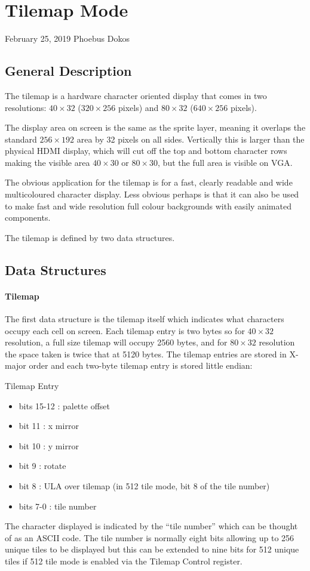 \section{Tilemap Mode}

February 25, 2019  Phoebus Dokos

\subsection{General Description}
The tilemap is a hardware character oriented display that comes in two
resolutions: $40\times32$ ($320\times256$ pixels) and $80\times32$
($640\times256$ pixels).

The display area on screen is the same as the sprite layer, meaning it
overlaps the standard $256\times192$ area by 32 pixels on all
sides. Vertically this is larger than the physical HDMI display, which
will cut off the top and bottom character rows making the visible area
$40\times30$ or $80\times30$, but the full area is visible on VGA.

The obvious application for the tilemap is for a fast, clearly
readable and wide multicoloured character display. Less obvious
perhaps is that it can also be used to make fast and wide resolution
full colour backgrounds with easily animated components.

The tilemap is defined by two data structures.

\subsection{Data Structures}

\paragraph{Tilemap}

The first data structure is the tilemap itself which indicates what
characters occupy each cell on screen. Each tilemap entry is two bytes
so for $40\times32$ resolution, a full size tilemap will occupy 2560
bytes, and for $80\times32$ resolution the space taken is twice that
at 5120 bytes. The tilemap entries are stored in X-major order and
each two-byte tilemap entry is stored little endian:

Tilemap Entry
\begin{itemize}
\item[] bits 15-12 : palette offset
\item[] bit 11 : x mirror
\item[] bit 10 : y mirror
\item[] bit 9 : rotate
\item[] bit 8 : ULA over tilemap (in 512 tile mode, bit 8 of the tile number)
\item[] bits 7-0 : tile number
\end{itemize}
The character displayed is indicated by the “tile number” which can be
thought of as an ASCII code. The tile number is normally eight bits
allowing up to 256 unique tiles to be displayed but this can be
extended to nine bits for 512 unique tiles if 512 tile mode is enabled
via the Tilemap Control register.

